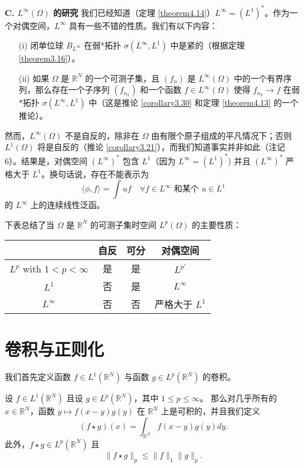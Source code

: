 \textbf{C. $L^\infty(\Omega)$ 的研究}
我们已经知道（定理 \ref{theorem4.14}）$L^\infty = (L^1)^*$。作为一个对偶空间，$L^\infty$ 具有一些不错的性质。我们有以下内容：
\begin{itemize}
    \item[(i)] 闭单位球 $B_{L^\infty}$ 在弱*拓扑 $\sigma(L^\infty, L^1)$ 中是紧的（根据定理 \ref{theorem3.16}）。
    \item[(ii)] 如果 $\Omega$ 是 $\mathbb{R}^N$ 的一个可测子集，且 $(f_n)$ 是 $L^\infty(\Omega)$ 中的一个有界序列，那么存在一个子序列 $(f_{n_k})$ 和一个函数 $f \in L^\infty(\Omega)$ 使得 $f_{n_k} \to f$ 在弱*拓扑 $\sigma(L^\infty, L^1)$ 中（这是推论 \ref{corollary3.30} 和定理 \ref{theorem4.13} 的一个推论）。
\end{itemize}
然而，$L^\infty(\Omega)$ 不是自反的，除非在 $\Omega$ 由有限个原子组成的平凡情况下；否则 $L^1(\Omega)$ 将是自反的（推论 \ref{corollary3.21}），而我们知道事实并非如此（注记 6）。结果是，对偶空间 $(L^\infty)^*$ 包含 $L^1$（因为 $L^\infty = (L^1)^*$) 并且 $(L^\infty)^*$ 严格大于 $L^1$。换句话说，存在不能表示为
\[ \langle \phi, f \rangle = \int uf \quad \forall f \in L^\infty \text{ 和某个 } u \in L^1 \]
的 $L^\infty$ 上的连续线性泛函。

下表总结了当 $\Omega$ 是 $\mathbb{R}^N$ 的可测子集时空间 $L^p(\Omega)$ 的主要性质：
\begin{center}
\begin{tabular}{|c|c|c|c|}
\hline
 & \textbf{自反} & \textbf{可分} & \textbf{对偶空间} \\
\hline
$L^p$ with $1<p<\infty$ & 是 & 是 & $L^{p'}$ \\
\hline
$L^1$ & 否 & 是 & $L^\infty$ \\
\hline
$L^\infty$ & 否 & 否 & 严格大于 $L^1$ \\
\hline
\end{tabular}
\end{center}

\section{卷积与正则化}

我们首先定义函数 $f \in L^1(\mathbb{R}^N)$ 与函数 $g \in L^p(\mathbb{R}^N)$ 的卷积。

\begin{theorem}[Young]\label{theorem4.15}
设 $f \in L^1(\mathbb{R}^N)$ 且设 $g \in L^p(\mathbb{R}^N)$，其中 $1 \le p \le \infty$。
那么对几乎所有的 $x \in \mathbb{R}^N$，函数 $y \mapsto f(x-y)g(y)$ 在 $\mathbb{R}^N$ 上是可积的，并且我们定义
\[ (f \star g)(x) = \int_{\mathbb{R}^N} f(x-y)g(y)dy. \]
此外，$f \star g \in L^p(\mathbb{R}^N)$ 且
\[ \|f \star g\|_p \le \|f\|_1 \|g\|_p. \]
\end{theorem}


